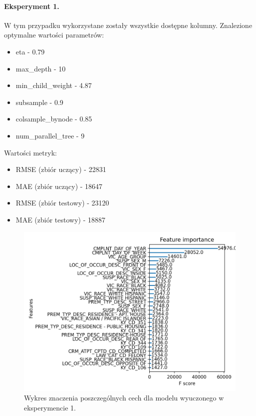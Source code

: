 \documentclass{classrep}
\begin{document}
{{{                \paragraph{Eksperyment 1.} W tym przypadku wykorzystane zostały wszystkie
                dostępne kolumny. Znalezione optymalne wartości parametrów:
                \begin{itemize}
                    \item eta - 0.79
                    \item max\_depth - 10
                    \item min\_child\_weight - 4.87
                    \item subsample - 0.9
                    \item colsample\_bynode - 0.85
                    \item num\_parallel\_tree - 9
                \end{itemize}
                Wartości metryk:
                \begin{itemize}
                    \item RMSE (zbiór uczący) - 22831
                    \item MAE (zbiór uczący) - 18647
                    \item RMSE (zbiór testowy) - 23120
                    \item MAE (zbiór testowy) - 18887
                \end{itemize}
                \begin{figure}[!htbp]
                    \centering
                    \includegraphics[width=\textwidth]{img/importance_1.png}
                    \caption{Wykres znaczenia poszczególnych cech dla modelu wyuczonego w eksperymencie 1.}
                    \label{importance_1}
                \end{figure}
                \FloatBarrier
                
}}}
\end{document}
